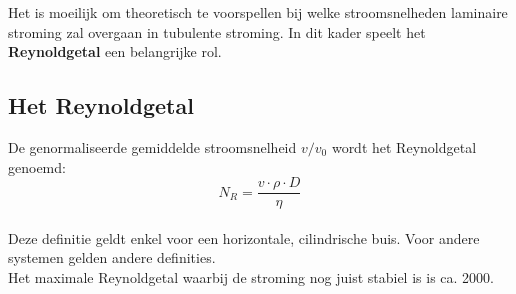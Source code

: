 Het is moeilijk om theoretisch te voorspellen bij welke stroomsnelheden laminaire
stroming zal overgaan in tubulente stroming. In dit kader speelt het 
\textbf{Reynoldgetal} een belangrijke rol.
\\

\subsection{Het Reynoldgetal}
De genormaliseerde gemiddelde stroomsnelheid $v/v_{0}$ wordt het Reynoldgetal genoemd:
\\

$$N_{R} = \frac{v \cdot \rho \cdot D}{\eta}$$
\\

Deze definitie geldt enkel voor een horizontale, cilindrische buis.
Voor andere systemen gelden andere definities.
\\

Het maximale Reynoldgetal waarbij de stroming nog juist stabiel is is ca. 2000.